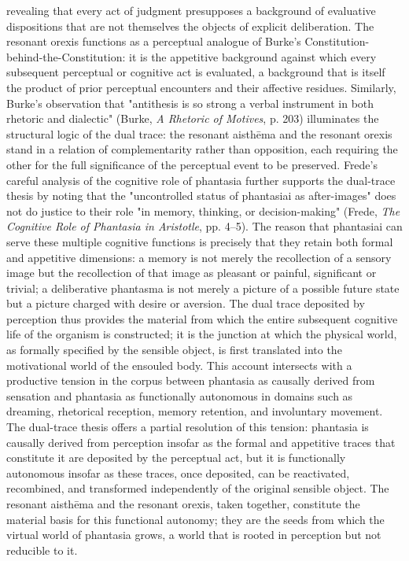 revealing that every act of judgment presupposes a background of evaluative dispositions that are not themselves the objects of explicit deliberation. The resonant orexis functions as a perceptual analogue of Burke's Constitution-behind-the-Constitution: it is the appetitive background against which every subsequent perceptual or cognitive act is evaluated, a background that is itself the product of prior perceptual encounters and their affective residues. Similarly, Burke's observation that "antithesis is so strong a verbal instrument in both rhetoric and dialectic" (Burke, \textit{A Rhetoric of Motives}, p. 203) illuminates the structural logic of the dual trace: the resonant aisthēma and the resonant orexis stand in a relation of complementarity rather than opposition, each requiring the other for the full significance of the perceptual event to be preserved. Frede's careful analysis of the cognitive role of phantasia further supports the dual-trace thesis by noting that the "uncontrolled status of phantasiai as after-images" does not do justice to their role "in memory, thinking, or decision-making" (Frede, \textit{The Cognitive Role of Phantasia in Aristotle}, pp. 4--5). The reason that phantasiai can serve these multiple cognitive functions is precisely that they retain both formal and appetitive dimensions: a memory is not merely the recollection of a sensory image but the recollection of that image as pleasant or painful, significant or trivial; a deliberative phantasma is not merely a picture of a possible future state but a picture charged with desire or aversion. The dual trace deposited by perception thus provides the material from which the entire subsequent cognitive life of the organism is constructed; it is the junction at which the physical world, as formally specified by the sensible object, is first translated into the motivational world of the ensouled body. This account intersects with a productive tension in the corpus between phantasia as causally derived from sensation and phantasia as functionally autonomous in domains such as dreaming, rhetorical reception, memory retention, and involuntary movement. The dual-trace thesis offers a partial resolution of this tension: phantasia is causally derived from perception insofar as the formal and appetitive traces that constitute it are deposited by the perceptual act, but it is functionally autonomous insofar as these traces, once deposited, can be reactivated, recombined, and transformed independently of the original sensible object. The resonant aisthēma and the resonant orexis, taken together, constitute the material basis for this functional autonomy; they are the seeds from which the virtual world of phantasia grows, a world that is rooted in perception but not reducible to it. 


